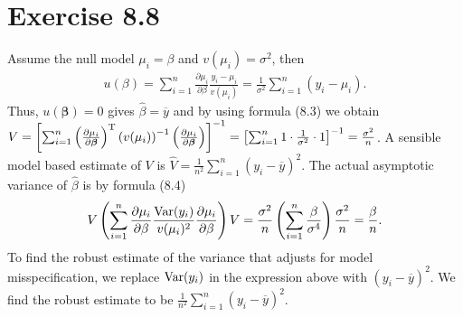 \vspace{\baselineskip}
\section*{Exercise 8.8}
Assume the null model $\mu_{i} = \beta$ and $v(\mu_{i}) = \sigma^{2}$, then
\begin{align*}
u(\beta) = \sum_{i=1}^{n}\frac{\partial \mu_{i}}{\partial \beta} \frac{y_{i}-\mu_{i}}{v(\mu_{i})} = \frac{1}{\sigma^{2}} \sum_{i=1}^{n}(y_{i}-\mu_{i}).
\end{align*}
Thus, $u(\bm{\beta}) = 0$ gives $\widehat{\beta} = \overline{y}$ and by using formula (8.3) we obtain $V = \left[\sum_{i=1}^{n}\left(\frac{\partial \mu_{i}}{\partial \bm{\beta}}\right)^{\rm T}\left(v(\mu_{i})\right)^{-1}\left(\frac{\partial \mu_{i}}{\partial \bm{\beta}}\right)\right]^{-1} = \left[\sum_{i=1}^{n}1 \cdot \frac{1}{\sigma^{2}} \cdot 1\right]^{-1} = \frac{\sigma^{2}}{n}$. A sensible model based estimate of $V$ is $\widehat{V} = \frac{1}{n^{2}}\sum_{i=1}^{n}(y_{i}-\overline{y})^{2}$. The actual asymptotic variance of $\widehat{\beta}$ is by formula (8.4)
\begin{align*}
V\left(\sum_{i=1}^{n}\frac{\partial \mu_{i}}{\partial \beta}\frac{\mathrm{Var}(y_{i})}{v(\mu_{i})^{2}}\frac{\partial \mu_{i}}{\partial \beta}\right)V = \frac{\sigma^{2}}{n}\left(\sum_{i=1}^{n}\frac{\beta}{\sigma^{4}}\right)\frac{\sigma^{2}}{n} = \frac{\beta}{n}.
\end{align*}
To find the robust estimate of the variance that adjusts for model misspecification, we replace $\mathrm{Var}(y_{i})$ in the expression above with $(y_{i}-\overline{y})^{2}$. We find the robust estimate to be $\frac{1}{n^{2}}\sum_{i=1}^{n}(y_{i}-\overline{y})^{2}$.